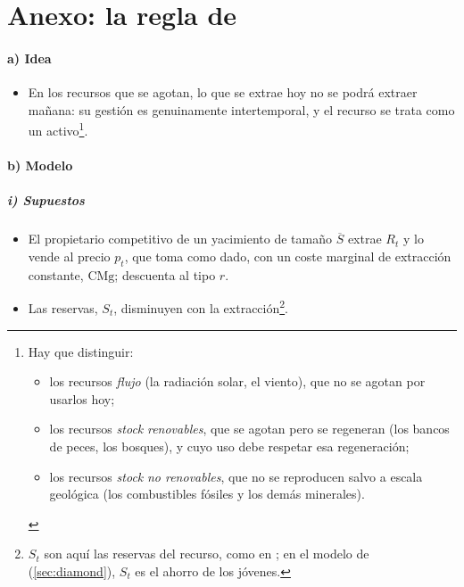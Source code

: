 \documentclass[11pt]{article}
\begin{document}
\section{Anexo: la regla de }\label{anexo:hotelling}

\paragraph{a) Idea}

\begin{itemize}
\item En los recursos que se agotan, lo que se extrae hoy no se podrá extraer mañana: su gestión es genuinamente intertemporal, y el recurso se trata como un activo\footnote{Hay que distinguir:
\begin{itemize}
\item los recursos \emph{flujo} (la radiación solar, el viento), que no se agotan por usarlos hoy;
\item los recursos \emph{stock} \emph{renovables}, que se agotan pero se regeneran (los bancos de peces, los bosques), y cuyo uso debe respetar esa regeneración;
\item los recursos \emph{stock} \emph{no renovables}, que no se reproducen salvo a escala geológica (los combustibles fósiles y los demás minerales).
\end{itemize}}.
\end{itemize}

\paragraph{b) Modelo}

\subparagraph{i) Supuestos}

\begin{itemize}
\item El propietario competitivo de un yacimiento de tamaño $\overline S$ extrae $R_t$ y lo vende al precio $p_t$, que toma como dado, con un coste marginal de extracción constante, $\mathrm{CMg}$; descuenta al tipo $r$\nocite{Hotelling1931Economics,PermanEtAl2011Natural}.
\item Las reservas, $S_t$, disminuyen con la extracción\footnote{$S_t$ son aquí las reservas del recurso, como en \textcite{PermanEtAl2011Natural}; en el modelo de  (\ref{sec:diamond}), $S_t$ es el ahorro de los jóvenes.}.
\end{itemize}
\end{document}
